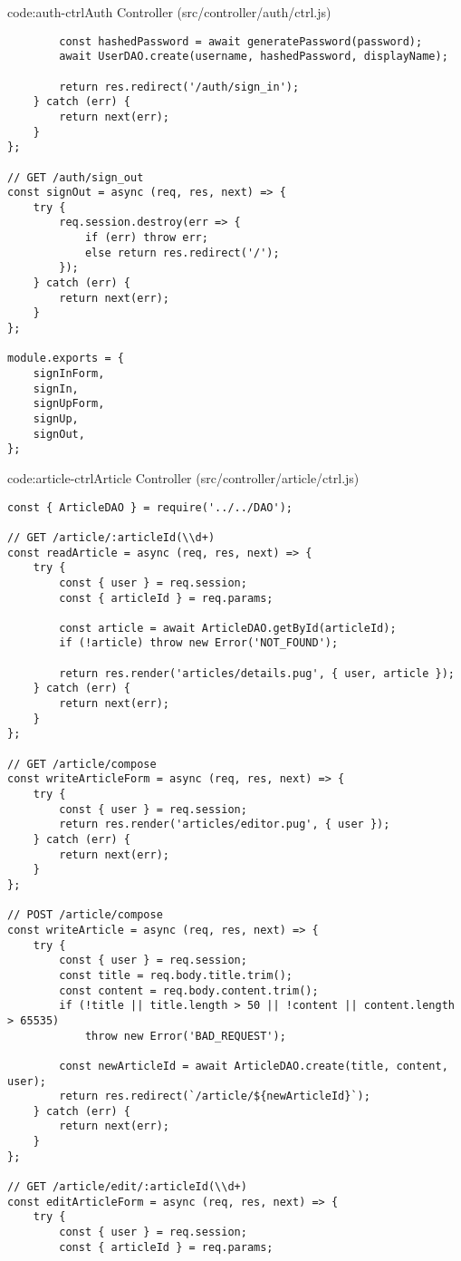 \begin{codeenv}{code:auth-ctrl}{Auth Controller (src/controller/auth/ctrl.js)}
\begin{verbatim}
        const hashedPassword = await generatePassword(password);
        await UserDAO.create(username, hashedPassword, displayName);

        return res.redirect('/auth/sign_in');
    } catch (err) {
        return next(err);
    }
};

// GET /auth/sign_out
const signOut = async (req, res, next) => {
    try {
        req.session.destroy(err => {
            if (err) throw err;
            else return res.redirect('/');
        });
    } catch (err) {
        return next(err);
    }
};

module.exports = {
    signInForm,
    signIn,
    signUpForm,
    signUp,
    signOut,
};
\end{verbatim}
\end{codeenv}

\begin{codeenv}{code:article-ctrl}{Article Controller (src/controller/article/ctrl.js)}\begin{verbatim}
const { ArticleDAO } = require('../../DAO');

// GET /article/:articleId(\\d+)
const readArticle = async (req, res, next) => {
    try {
        const { user } = req.session;
        const { articleId } = req.params;

        const article = await ArticleDAO.getById(articleId);
        if (!article) throw new Error('NOT_FOUND');

        return res.render('articles/details.pug', { user, article });
    } catch (err) {
        return next(err);
    }
};

// GET /article/compose
const writeArticleForm = async (req, res, next) => {
    try {
        const { user } = req.session;
        return res.render('articles/editor.pug', { user });
    } catch (err) {
        return next(err);
    }
};

// POST /article/compose
const writeArticle = async (req, res, next) => {
    try {
        const { user } = req.session;
        const title = req.body.title.trim();
        const content = req.body.content.trim();
        if (!title || title.length > 50 || !content || content.length > 65535)
            throw new Error('BAD_REQUEST');

        const newArticleId = await ArticleDAO.create(title, content, user);
        return res.redirect(`/article/${newArticleId}`);
    } catch (err) {
        return next(err);
    }
};

// GET /article/edit/:articleId(\\d+)
const editArticleForm = async (req, res, next) => {
    try {
        const { user } = req.session;
        const { articleId } = req.params;


\end{verbatim}
\end{codeenv}
